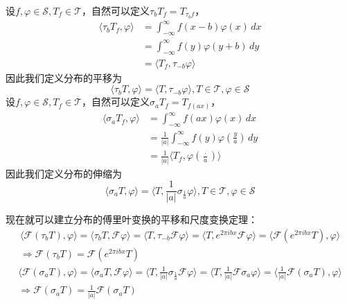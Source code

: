 \documentclass{ctexbook}
\begin{document}
设$f,\varphi\in\mathcal{S} ,T_f\in\mathcal{T} $，自然可以定义$\tau_b T_f=T_{\tau_b f}$，
\begin{align*}
    \langle \tau_b T_f,\varphi\rangle & =\int_{-\infty}^{\infty}f(x-b)\varphi(x)\,dx \\
                                      & =\int_{-\infty}^{\infty}f(y)\varphi(y+b)\,dy \\
                                      & =\langle T_f,\tau_{-b}\varphi\rangle
\end{align*}
因此我们定义分布的平移为
\begin{equation}
    \langle \tau_b T,\varphi\rangle=\langle T,\tau_{-b}\varphi\rangle,T\in\mathcal{T} ,\varphi\in\mathcal{S}
\end{equation}
设$f,\varphi\in\mathcal{S} ,T_f\in\mathcal{T} $，自然可以定义$\sigma_a T_f=T_{f(ax)}$，
\begin{align*}
    \langle \sigma_a T_f,\varphi\rangle & =\int_{-\infty}^{\infty}f(ax)\varphi(x)\,dx                                  \\
                                        & =\frac{1}{|a|}\int_{-\infty}^{\infty}f(y)\varphi\left(\frac{y}{a}\right)\,dy \\
                                        & =\frac{1}{|a|}\langle T_f,\varphi\left(\frac{\cdot}{a}\right)\rangle
\end{align*}
因此我们定义分布的伸缩为
\begin{equation}
    \langle\sigma_a T,\varphi\rangle=\langle T,\frac{1}{|a|}\sigma_{\frac{1}{a}}\varphi\rangle,T\in\mathcal{T} ,\varphi\in\mathcal{S}
\end{equation}

现在就可以建立分布的傅里叶变换的平移和尺度变换定理：
\begin{align*}
    \langle\mathcal{F}(\tau_b T),\varphi\rangle =\langle \tau_b T,\mathcal{F}\varphi\rangle=\langle T,\tau_{-b}\mathcal{F}\varphi\rangle=\langle T,e^{2\pi ibx}\mathcal{F}\varphi\rangle=\langle \mathcal{F}(e^{2\pi ibx}T),\varphi\rangle \\
    \Rightarrow\mathcal{F}(\tau_b T)           =\mathcal{F}(e^{2\pi ibx}T)
\end{align*}
\begin{align*}
    \langle\mathcal{F}(\sigma_a T),\varphi\rangle =\langle \sigma_a T,\mathcal{F}\varphi\rangle=\langle T,\frac{1}{|a|}\sigma_{\frac{1}{a}}\mathcal{F}\varphi\rangle=\langle T,\frac{1}{|a|}\mathcal{F}\sigma_a \varphi\rangle=\langle \frac{1}{|a|}\mathcal{F}(\sigma_a T),\varphi\rangle \\
    \Rightarrow\mathcal{F}(\sigma_a T)           =\frac{1}{|a|}\mathcal{F}(\sigma_a T)
\end{align*}
\end{document}
